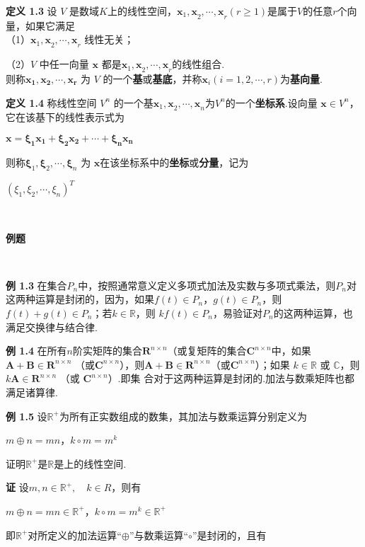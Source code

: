 \documentclass[12pt, a4paper, oneside, fontset=none]{ctexart}
\begin{document}
\textbf{定义 1.3} \quad 设 $V$ 是数域$K$上的线性空间，$\bm{x}_1\bm{,x}_2\bm{, \cdots, x}_r(r \geqslant 1)$是属于$V$的任意$r$个向
量，如果它满足 \\
（1）$\bm{x}_1\bm{,x}_2\bm{, \cdots, x}_r$ 线性无关； \par
（2）$V$ 中任一向量 $\bm{x}$ 都是$\bm{x}_1\bm{,x}_2\bm{, \cdots, x}_r$的线性组合. \\
则称$\bm{x_1,x_2, \cdots, x_r}$ 为 $V$ 的一个\textbf{基}或\textbf{基底}，并称$\bm{x}_i(i = 1,2,\cdots,r)$为\textbf{基向量}.

\textbf{定义 1.4} \quad 称线性空间 $V^n$ 的一个基$\bm{x}_1\bm{,x}_2\bm{, \cdots, x}_n$为$V^n$的一个\textbf{坐标系}.设向量 $\bm{x} \in V^n$，
它在该基下的线性表示式为 \\
\centerline{$\bm{x = \xi_1x_1 + \xi_2x_2 + \cdots + \xi_nx_n}$}
则称$\bm{\xi}_1\bm{,\xi}_2\bm{, \cdots, \xi}_n$ 为 $\bm{x}$在该坐标系中的\textbf{坐标}或\textbf{分量}，记为 \\
\centerline{$(\xi_1, \xi_2 ,\bm{\cdots},\xi_n)^T$} \par \ \par

\centerline{\large{\textbf{例题}}} \ \par

\textbf{例 1.3} \quad 在集合$P_n$中，按照通常意义定义多项式加法及实数与多项式乘法，则$P_n$对
这两种运算是封闭的，因为，如果$f(t)\in P_n$，$g(t) \in P_n$，则$f(t) + g(t) \in P_n$；若$k \in \mathbb{R}$，则
$kf(t)\in P_n$，易验证对$P_n$的这两种运算，也满足交换律与结合律.

\textbf{例 1.4} \quad 在所有$n$阶实矩阵的集合$\mathbf{R}^{n\times n}$（或复矩阵的集合$\mathbf{C}^{n\times n}$中，如果 $\mathbf{A} + \mathbf{B} \in \mathbf{R}^{n \times n}$
（或$\mathbf{C}^{n \times n}$），则$\mathbf{A + B} \in \mathbf{R}^{n \times n}$（或$\mathbf{C}^{n \times n}$）；如果 $k \in \mathbb{R}$ 或 $\mathbb{C}$，则$k \mathbf{A} \in \mathbf{R}^{n \times n}$ （或 $\mathbf{C}^{n \times n}$）.即集
合对于这两种运算是封闭的.加法与数乘矩阵也都满足诸算律.

\textbf{例 1.5} \quad 设$\mathbb{R^{+}}$为所有正实数组成的数集，其加法与数乘运算分别定义为 \\
\centerline{$m \oplus n = mn$，\quad $k \circ m = m^k $}
证明$\mathbb{R^{+}}$是$\mathbb{R}$是上的线性空间. \par

\textbf{证} \quad 设$m,n\in \mathbb{R^+}, \quad k \in R$，则有 \\
\centerline{$m \oplus n = mn \in \mathbb{R^+}$，\quad $k \circ m = m^k \in \mathbb{R^+}$}
即$\mathbb{R^+}$对所定义的加法运算“$\oplus$”与数乘运算“$\circ$”是封闭的，且有 \par
\end{document}
